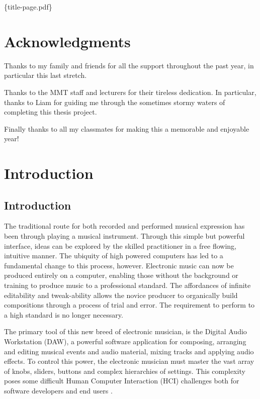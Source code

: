 \documentclass[12pt]{report}
\date{\today}
\title{}
\begin{document}
\frontmatter

\{title-page.pdf\}

\part{Acknowledgments}
\label{sec:org84e8c84}

\begin{large}
Thanks to my family and friends for all the support throughout the past year, in
particular this last stretch.

Thanks to the MMT staff and lecturers for their tireless dedication. In
particular, thanks to Liam for guiding me through the sometimes stormy waters of
completing this thesis project.

Finally thanks to all my classmates for making this a memorable and enjoyable
year!
\end{large}


\tableofcontents
\cleardoublepage

\listoffigures
\cleardoublepage

\mainmatter
\part{Introduction}
\label{sec:orgf98f3fc}
\chapter{Introduction}
\label{sec:org4165008}
The traditional route for both recorded and performed musical expression has
been through playing a musical instrument. Through this simple but powerful
interface, ideas can be explored by the skilled practitioner in a free flowing,
intuitive manner. The ubiquity of high powered computers has led to a
fundamental change to this process, however. Electronic music can now be
produced entirely on a computer, enabling those without the background or
training to produce music to a professional standard. The affordances of
infinite editability and tweak-ability allows the novice producer to organically
build compositions through a process of trial and error. The requirement to
perform to a high standard is no longer necessary.

The primary tool of this new breed of electronic musician, is the Digital Audio
Workstation (DAW), a powerful software application for composing, arranging and
editing musical events and audio material, mixing tracks and applying audio
effects. To control this power, the electronic musician must master the vast
array of knobs, sliders, buttons and complex hierarchies of settings. This
complexity poses some difficult Human Computer Interaction (HCI) challenges both
for software developers and end users \cite{duignan_abstraction_2010}.
\end{document}
